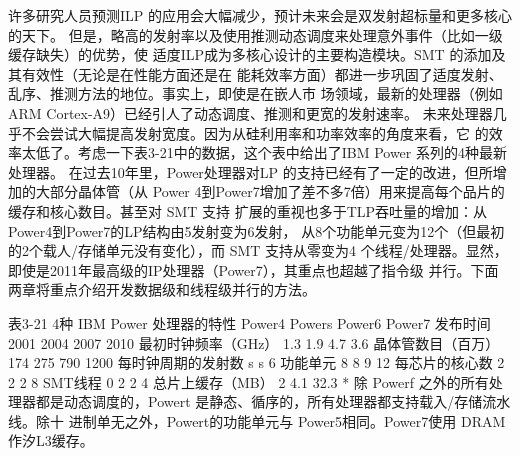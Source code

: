 许多研究人员预测ILP 的应用会大幅减少，预计未来会是双发射超标量和更多核心的天下。
但是，略高的发射率以及使用推测动态调度来处理意外事件（比如一级缓存缺失）的优势，使
适度ILP成为多核心设计的主要构造模块。SMT 的添加及其有效性（无论是在性能方面还是在
能耗效率方面）都进一步巩固了适度发射、乱序、推测方法的地位。事实上，即使是在嵌人市
场领域，最新的处理器（例如 ARM Cortex-A9）已经引人了动态调度、推测和更宽的发射速率。
未来处理器几乎不会尝试大幅提高发射宽度。因为从硅利用率和功率效率的角度来看，它
的效率太低了。考虑一下表3-21中的数据，这个表中给出了IBM Power 系列的4种最新处理器。
在过去10年里，Power处理器对LP 的支持已经有了一定的改进，但所增加的大部分晶体管（从
Power 4到Power7增加了差不多7倍）用来提高每个品片的缓存和核心数目。甚至对 SMT 支持
扩展的重视也多于TLP吞吐量的增加：从 Power4到Power7的LP结构由5发射变为6发射，
从8个功能单元变为12个（但最初的2个载人/存储单元没有变化），而 SMT 支持从零变为4
个线程/处理器。显然，即使是2011年最高级的IP处理器（Power7），其重点也超越了指令级
并行。下面两章将重点介绍开发数据级和线程级并行的方法。

表3-21 4种 IBM Power 处理器的特性
Power4
Powers
Power6
Power7
发布时间
2001
2004
2007
2010
最初时钟频率（GHz）
1.3
1.9
4.7
3.6
晶体管数目（百万）
174
275
790
1200
每时钟周期的发射数
s
s
6
功能单元
8
8
9
12
每芯片的核心数
2
2
2
8
SMT线程
0
2
2
4
总片上缓存（MB）
2
4.1
32.3
* 除 Powerf 之外的所有处理器都是动态调度的，Powert 是静态、循序的，所有处理器都支持载入/存储流水线。除十
进制单无之外，Powert的功能单元与 Power5相同。Power7使用 DRAM作汐L3缓存。

